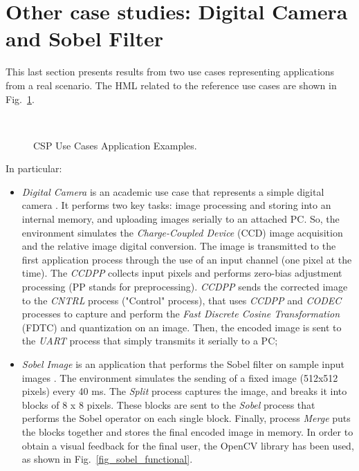 \section{Other case studies: Digital Camera and Sobel Filter}
%
This last section presents results from two use cases representing applications from a real scenario. The HML related to the reference use cases are shown in Fig.~\ref{fig_hml_digitalcam_sobel}. \par
%
\begin{figure}[htbp]
    \centering
    \label{5a_digit} \ \ \ \ 
    \label{5b_sobel} 
  \caption{CSP Use Cases Application Examples.} 
  \label{fig_hml_digitalcam_sobel} 
\end{figure}
%
In particular:
%
\begin{itemize}
    \item \textit{Digital Camera} is an academic use case that represents a simple digital camera \cite{bib35}. It performs two key tasks: image processing and storing into an internal memory, and uploading images serially to an attached PC. So, the environment simulates the \textit{Charge-Coupled Device} (CCD) image acquisition and the relative image digital conversion. The image is transmitted to the first application process through the use of an input channel (one pixel at the time). The \textit{CCDPP} collects input pixels and performs zero-bias adjustment processing (PP stands for preprocessing). \textit{CCDPP} sends the corrected image to the \textit{CNTRL} process ("Control" process), that uses \textit{CCDPP} and \textit{CODEC} processes to capture and perform the \textit{Fast Discrete Cosine Transformation} (FDTC) and quantization on an image. Then, the encoded image is sent to the \textit{UART} process that simply transmits it serially to a PC;
    \item \textit{Sobel Image} is an application that performs the Sobel filter on sample input images \cite{bib36}. The environment simulates the sending of a fixed image (512x512 pixels) every 40 ms. The \textit{Split} process captures the image, and breaks it into blocks of 8 x 8 pixels. These blocks are sent to the \textit{Sobel} process that performs the Sobel operator on each single block. Finally, process \textit{Merge} puts the blocks together and stores the final encoded image in memory. In order to obtain a visual feedback for the final user, the OpenCV library has been used, as shown in Fig.~\ref{fig_sobel_functional}.
\end{itemize}
